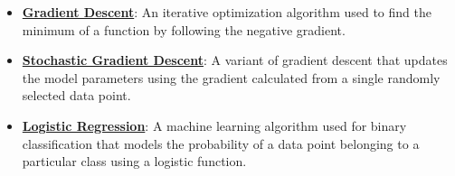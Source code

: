 \documentclass{article}%
\begin{document}
\begin{itemize}[leftmargin=*]
\item \href{https://purdue.brightspace.com/d2l/common/assets/pdfjs-d2l-dist/1.0.14-legacy/web/viewer.html?file=\%2Fcontent\%2Fenforced\%2F1095467-wl.202510.CS.24300.001\%2F05L2-ML Basics.pdf\%3Fou\%3D1095467\&lang=en-us\&container=d2l-fileviewer-rendered-pdf\&fullscreen=d2l-fileviewer-rendered-pdf-dialog\&height=667#page=28}{\textbf{Gradient Descent}}: An iterative optimization algorithm used to find the minimum of a function by following the negative gradient.%
\item \href{https://purdue.brightspace.com/d2l/common/assets/pdfjs-d2l-dist/1.0.14-legacy/web/viewer.html?file=\%2Fcontent\%2Fenforced\%2F1095467-wl.202510.CS.24300.001\%2F05L2-ML Basics.pdf\%3Fou\%3D1095467\&lang=en-us\&container=d2l-fileviewer-rendered-pdf\&fullscreen=d2l-fileviewer-rendered-pdf-dialog\&height=667#page=29}{\textbf{Stochastic Gradient Descent}}: A variant of gradient descent that updates the model parameters using the gradient calculated from a single randomly selected data point.%
\item \href{https://purdue.brightspace.com/d2l/common/assets/pdfjs-d2l-dist/1.0.14-legacy/web/viewer.html?file=\%2Fcontent\%2Fenforced\%2F1095467-wl.202510.CS.24300.001\%2F05L2-ML Basics.pdf\%3Fou\%3D1095467\&lang=en-us\&container=d2l-fileviewer-rendered-pdf\&fullscreen=d2l-fileviewer-rendered-pdf-dialog\&height=667#page=31}{\textbf{Logistic Regression}}: A machine learning algorithm used for binary classification that models the probability of a data point belonging to a particular class using a logistic function.%
\end{itemize}%
\end{document}
